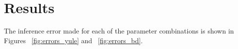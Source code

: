 \section{Results}

The inference error made for each of the parameter combinations
is shown in Figures ~\ref{fig:errors_yule} and ~\ref{fig:errors_bd}. 

\iffalse %
\richel{if true:}The lowest errors are at settings where $nu = 0 \vee q = 0$,
confirming $\mathcal{H}_1$.

\richel{if true:}For both extinction rates,
we find that the error increases as $\nu$
and $q$ increase, confirming $\mathcal{H}_2$

\richel{if true:}There is no difference between the
errors for the two different extinction rates, which
confirms $\mathcal{H}_4$

[other hypotheses being rejected/accepted here]
\fi
